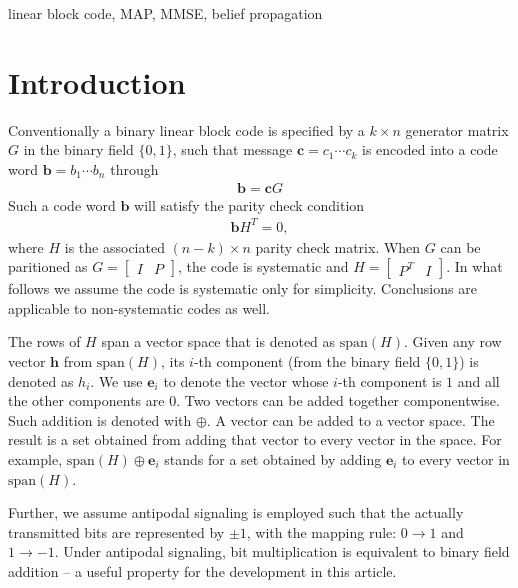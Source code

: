 \documentclass[conference]{IEEEtran}
\newcommand{\vect}[1]{\mathbf{#1}}
\begin{document}
\begin{IEEEkeywords}
linear block code, MAP, MMSE, belief propagation
\end{IEEEkeywords}

\section{Introduction}
Conventionally a binary linear block code is specified by a $k\times n$ generator matrix $G$ in the binary field $\{0,1\}$, such that message $\vect{c}=c_1\cdots c_k$ is encoded into a code word $\vect{b} = b_1\cdots b_n$ through
\begin{align}
\vect{b} = \vect{c}G
\end{align}
Such a code word $\vect{b}$ will satisfy the parity check condition
\begin{align}
\vect{b}H^T=0,
\end{align}
where $H$ is the associated $(n-k)\times n$ parity check matrix. When $G$ can be paritioned as $G=\begin{bmatrix}I &P\end{bmatrix}$, the code is systematic and $H = \begin{bmatrix}P^T & I\end{bmatrix}$. In what follows we assume the code is systematic only for simplicity. Conclusions are applicable to non-systematic codes as well.

The rows of $H$ span a vector space that is denoted as $\mathrm{span}(H)$. Given any row vector $\vect{h}$ from $\mathrm{span}(H)$, its $i$-th component (from the binary field $\{0,1\}$) is denoted as $h_i$. We use $\vect{e}_i$ to denote the vector whose $i$-th component is $1$ and all the other components are $0$. Two vectors can be added together componentwise. Such addition is denoted with $\oplus$. A vector can be added to a vector space. The result is a set obtained from adding that vector to every vector in the space. For example, $\mathrm{span}(H)\oplus \vect{e}_i$ stands for a set obtained by adding $\vect{e}_i$ to every vector in $\mathrm{span}(H)$.

Further, we assume antipodal signaling is employed such that the actually transmitted bits are represented by $\pm 1$, with the mapping rule: $0\rightarrow 1$ and $1\rightarrow -1$. Under antipodal signaling, bit multiplication is equivalent to binary field addition -- a useful property for the development in this article.
\end{document}
